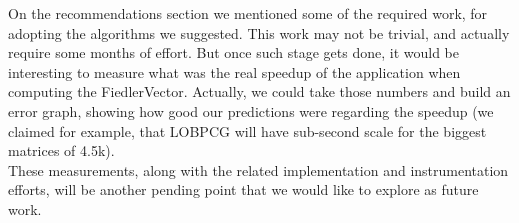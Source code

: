 On the recommendations section we mentioned some of the required work,
for adopting the algorithms we suggested. This work may not be
trivial, and actually require some months of effort. But
once such stage gets done, it would be interesting to measure what was
the real speedup of the application when computing the 
\gls{FiedlerVector}. Actually, we could take those numbers and build an
error graph, showing how good our predictions were regarding the
speedup (we claimed for example, that \gls{LOBPCG} will have
sub-second scale for the biggest matrices of 4.5k). \\

These measurements, along with the related implementation and
instrumentation efforts, will be another pending point that we would
like to explore as future work.


